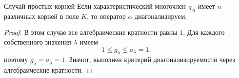 \begin{Corollary}{Случай простых корней}{}
	Если характеристический многочлен $\chi_\alpha$ имеет $n$ различных корней в поле $K$,
	то оператор $\alpha$ диагонализируем.
\end{Corollary}

\begin{proof}
	В этом случае все алгебраические кратности равны $1$.
	Для каждого собственного значения $\lambda$ имеем
	\[
	1\le g_\lambda\le a_\lambda=1,
	\]
	поэтому $g_\lambda=a_\lambda=1$.
	Значит, выполнен критерий диагонализируемости через алгебраические кратности.
\end{proof}